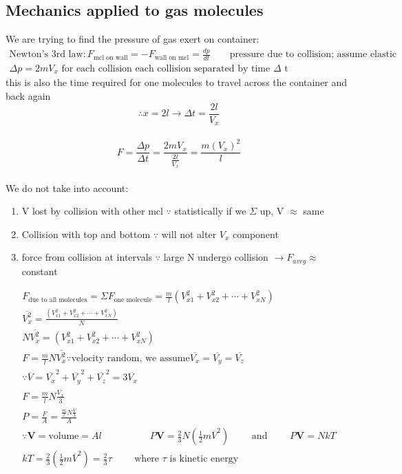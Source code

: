 \documentclass[12 pt, twoside, a4paper] {article}
\begin{document}
\subsection{Mechanics applied to gas molecules}
We are trying to find the pressure of gas exert on container:
\begin{align}
\text{Newton's 3rd law}: F_{\text{mcl on wall}} = - F_{\text{wall on mcl}}
						=\frac{dp}{dt} \quad \quad \text{pressure due to collision; assume elastic} \nonumber
\\ \Delta p = 2mV_x  \text{ for each collision each collision separated by time $\Delta$ t}\nonumber
\end{align} 
this is also the time required for one molecules to travel across the container and back again
\\$$\therefore x=2l \rightarrow \Delta t = \frac{2l}{V_x}$$
\\ $$ F= \frac{\Delta p}{\Delta t}= \frac{2 m V_x}{\frac{2l}{V_x}}=\frac{m(V_x)^2}{l}$$
\\ We do not take into account:
\begin{enumerate}
\item V lost by collision with other mcl $\because$ statistically if we $\Sigma$ up, V $\approx$ same
\item Collision with top and bottom $\because$ will not alter $V_x$ component
\item force from collision at intervals $\because$ large N undergo collision $\rightarrow 
F_{avrg} \approx$ constant
\end{enumerate}
\begin{gather*}
F_{\text{due to all molecules}}=\Sigma F_{\text{one molecule}}=\frac{m}{l} (V_{x1}^2+ V_{x2}^2+ \cdots +V_{xN}^2)
\\ \overline{V_x^2}=\frac{(V_{x1}^2+ V_{x2}^2+ \cdots +V_{xN}^2)}{N}
\\ N \overline{V_x^2}=(V_{x1}^2+ V_{x2}^2+ \cdots +V_{xN}^2)
\\  F=\frac{m}{l}N\overline{V^2_x} \because \text{velocity random, we assume}\overline{V_x}= \overline{V_y}=\overline{V_z} 
\\ \because \overline{V}=\overline{V_x}^2+\overline{V_y}^2+\overline{V_z}^2=3\overline{V_x}
\\ F=\frac{m}{l}N\frac{\overline{V_x}}{3}
\\ P=\frac{F}{A}=\frac{\frac{m}{l}N\frac{\overline{V}}{3}}{A} 
\\ \because \textbf{V}=\text{volume}=Al \quad\quad\quad\quad\quad P\textbf{V}= \frac{2}{3} N(\frac{1}{2} m \overline{V}^2) \quad\quad\text{ and }\quad\quad P\textbf{V}=NkT
\\kT= \frac{2}{3} (\frac{1}{2} m \overline{V}^2)= \frac{2}{3} \tau \quad \quad \text{  where $\tau$ is kinetic energy}
\end{gather*}
\end{document}
